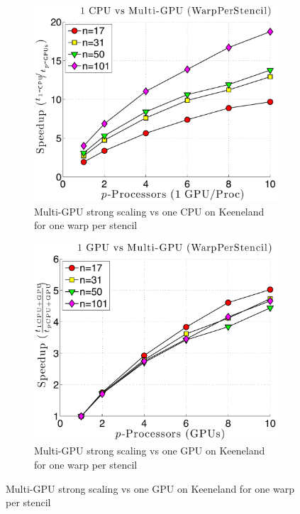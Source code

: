\begin{figure}
\begin{subfigure}[t]{0.425\textwidth}
\includegraphics[width=1.0\textwidth]{../figures/keeneland_results/alltoallv/speedup_1CPU_vs_NGPU_WarpPerStencil.pdf}
\caption{Multi-GPU strong scaling vs one CPU on Keeneland for one warp per stencil}
\label{fig:alltoall_multigpu_vs_cpu_scaling}
\end{subfigure} 
\begin{subfigure}[t]{0.425\textwidth}
\centering
\includegraphics[width=1.0\textwidth]{../figures/keeneland_results/alltoallv/speedup_1GPU_vs_NGPU_WarpPerStencil.pdf}
\caption{Multi-GPU strong scaling vs one GPU on Keeneland for one warp per stencil}
\label{fig:alltoall_multigpu_vs_gpu_scaling}
\end{subfigure} 
\end{figure}

